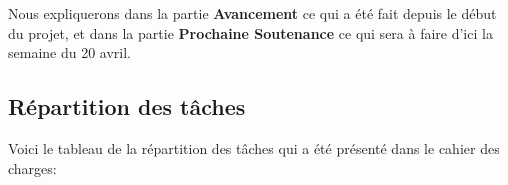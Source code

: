 \documentclass[11pt, a4paper]{report}
\begin{document}
\begin{table}[H]
\centering
{}
\end{table}

Nous expliquerons dans la partie \textbf{Avancement} ce qui a été fait depuis le début du projet, et dans la partie \textbf{Prochaine Soutenance} ce qui sera à faire d'ici la semaine du 20 avril.

    \subsection{Répartition des tâches}
Voici le tableau de la répartition des tâches qui a été présenté dans le cahier des charges:
\end{document}
